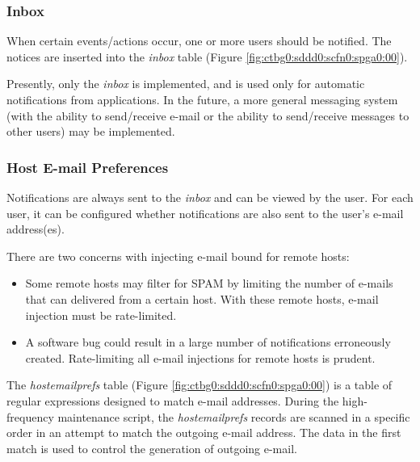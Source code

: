 \subsubsection{Inbox}
\label{ctbg0:sddd0:scfn0:sinb0}

When certain events/actions occur, one or more users should be notified.
The notices are inserted into the \emph{inbox} table 
(Figure \ref{fig:ctbg0:sddd0:scfn0:spga0:00}).

Presently, only the \emph{inbox} is implemented, and is used only for
automatic notifications from applications.  In the future, a more general messaging
system (with the ability to send/receive e-mail or the ability to send/receive
messages to other users) may be implemented.


\subsubsection{Host E-mail Preferences}
\label{ctbg0:sddd0:scfn0:shep0}

Notifications are always sent to the \emph{inbox} and can be viewed by the user.
For each user, it can be configured whether notifications are also sent to
the user's e-mail address(es).

There are two concerns with injecting e-mail bound for remote hosts:

\begin{itemize}
\item Some remote hosts may filter for SPAM by limiting the number of
      e-mails that can delivered from a certain host.  With these remote hosts,
      e-mail injection must be rate-limited.
\item A software bug could result in a large number of notifications erroneously
      created.  Rate-limiting all e-mail injections for remote hosts is prudent.      
\end{itemize}

The \emph{hostemailprefs} table (Figure \ref{fig:ctbg0:sddd0:scfn0:spga0:00})
is a table of regular expressions designed to match e-mail addresses.
During the high-frequency maintenance script, the \emph{hostemailprefs}
records are scanned in a specific order in an attempt to match
the outgoing e-mail address.  The data in the first match is used to control
the generation of outgoing e-mail.

